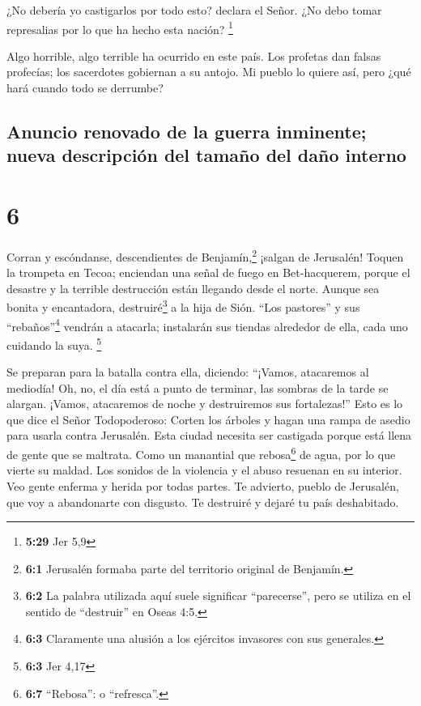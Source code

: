  ¿No debería yo castigarlos por todo esto? declara el
Señor. ¿No debo tomar represalias por lo que ha hecho esta nación?
\footnote{\textbf{5:29} Jer 5,9}

 Algo horrible, algo terrible ha ocurrido en este país.
 Los profetas dan falsas profecías; los sacerdotes
gobiernan a su antojo. Mi pueblo lo quiere así, pero ¿qué hará cuando
todo se derrumbe?

\hypertarget{anuncio-renovado-de-la-guerra-inminente-nueva-descripciuxf3n-del-tamauxf1o-del-dauxf1o-interno}{%
\subsection{Anuncio renovado de la guerra inminente; nueva descripción
del tamaño del daño
interno}\label{anuncio-renovado-de-la-guerra-inminente-nueva-descripciuxf3n-del-tamauxf1o-del-dauxf1o-interno}}

\hypertarget{section-5}{%
\section{6}\label{section-5}}

 Corran y escóndanse, descendientes de
Benjamín,\footnote{\textbf{6:1} Jerusalén formaba parte del territorio
  original de Benjamín.} ¡salgan de Jerusalén! Toquen la trompeta en
Tecoa; enciendan una señal de fuego en Bet-hacquerem, porque el desastre
y la terrible destrucción están llegando desde el norte. 
Aunque sea bonita y encantadora, destruiré\footnote{\textbf{6:2} La
  palabra utilizada aquí suele significar ``parecerse'', pero se utiliza
  en el sentido de ``destruir'' en Oseas 4:5.} a la hija de Sión.
 ``Los pastores'' y sus ``rebaños''\footnote{\textbf{6:3}
  Claramente una alusión a los ejércitos invasores con sus generales.}
vendrán a atacarla; instalarán sus tiendas alrededor de ella, cada uno
cuidando la suya. \footnote{\textbf{6:3} Jer 4,17}

 Se preparan para la batalla contra ella, diciendo:
``¡Vamos, atacaremos al mediodía! Oh, no, el día está a punto de
terminar, las sombras de la tarde se alargan.  ¡Vamos,
atacaremos de noche y destruiremos sus fortalezas!''  Esto
es lo que dice el Señor Todopoderoso: Corten los árboles y hagan una
rampa de asedio para usarla contra Jerusalén. Esta ciudad necesita ser
castigada porque está llena de gente que se maltrata. 
Como un manantial que rebosa\footnote{\textbf{6:7} ``Rebosa'': o
  ``refresca''.} de agua, por lo que vierte su maldad. Los sonidos de la
violencia y el abuso resuenan en su interior. Veo gente enferma y herida
por todas partes.  Te advierto, pueblo de Jerusalén, que
voy a abandonarte con disgusto. Te destruiré y dejaré tu país
deshabitado.

